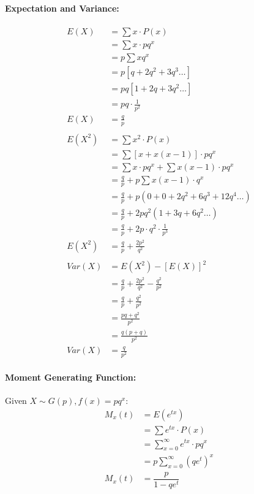 \documentclass[
10pt, %
a4paper, %
]{report}
\begin{document}
\paragraph{Expectation and Variance:}
\begin{align*}
    E(X) &= \sum x \cdot P(x) \\
         &= \sum x \cdot pq^x \\
         &= p\sum x q^x \\
         &= p [q+2q^2+3q^3\dots] \\
         &= pq \left[1+2q+3q^2\dots \right] \\
         &= pq \cdot \frac{1}{p^2} \\
    E(X) &= \frac{q}{p} \\ \\
    E(X^2) &= \sum x^2 \cdot P(x) \\
           &= \sum [x+x(x-1)] \cdot pq^x \\
           &= \sum x \cdot pq^x + \sum x(x-1) \cdot pq^x \\
           &= \frac{q}{p} + p\sum x(x-1) \cdot q^x \\
           &= \frac{q}{p} + p(0 + 0 + 2q^2 + 6q^3 + 12q^4 \dots)\\
           &= \frac{q}{p} + 2pq^2(1+3q+6q^2 \dots) \\
           &= \frac{q}{p} + 2p\cdot q^2\cdot \frac{1}{p^3} \\
    E(X^2) &= \frac{q}{p} + \frac{2p^2}{q^2} \\ \\
    Var(X) &= E(X^2) - [E(X)]^2 \\
           &= \frac{q}{p} + \frac{2p^2}{q^2} - \frac{q^2}{p^2} \\
           &= \frac{q}{p} + \frac{q^2}{p^2} \\
           &= \frac{pq+q^2}{p^2} \\
           &= \frac{q(p+q)}{p^2} \\
    Var(X) &= \frac{q}{p^2}
\end{align*}

\paragraph{Moment Generating Function:}
Given \(X \sim G(p), f(x)=pq^x:\)
\begin{align*}
    M_x(t) &= E(e^{tx}) \\
           &= \sum e^{tx} \cdot P(x) \\
           &= \sum_{x=0}^\infty e^{tx} \cdot pq^x \\
           &= p \sum_{x=0}^\infty (qe^t)^x \\
    M_x(t) &= \dfrac{p}{1-qe^t}
\end{align*}
\end{document}
